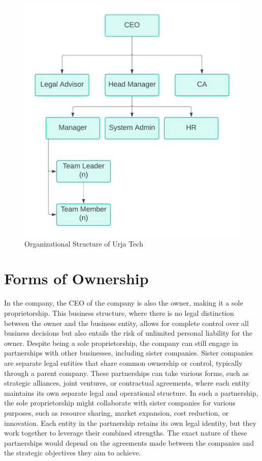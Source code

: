         \begin{figure}[H]
          
          \includegraphics[width=\textwidth]{./Graphics/orgchart.jpeg}
          \caption{Organizational Structure of Urja Tech}
          \label{fig:orgchart}
        \end{figure}
        

      \section{Forms of Ownership}
      In the company, the CEO of the company is also the owner, making it a sole proprietorship. This business structure, where there is no legal distinction between the owner and the business entity, allows for complete control over all business decisions but also entails the risk of unlimited personal liability for the owner. Despite being a sole proprietorship, the company can still engage in partnerships with other businesses, including sister companies. Sister companies are separate legal entities that share common ownership or control, typically through a parent company. These partnerships can take various forms, such as strategic alliances, joint ventures, or contractual agreements, where each entity maintains its own separate legal and operational structure. In such a partnership, the sole proprietorship might collaborate with sister companies for various purposes, such as resource sharing, market expansion, cost reduction, or innovation. Each entity in the partnership retains its own legal identity, but they work together to leverage their combined strengths. The exact nature of these partnerships would depend on the agreements made between the companies and the strategic objectives they aim to achieve.
